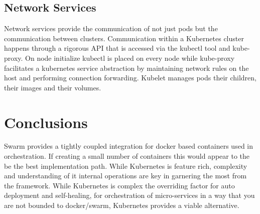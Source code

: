 \documentclass{article}
\begin{document}
\subsection{Network Services}
Network services provide the communication of not just pods but the communication between clusters. Communication within a Kubernetes cluster happens through a rigorous API that is accessed via the kubectl tool and kube-proxy. On node initialize kubectl is placed on every node while kube-proxy facilitates a kubernetes service abstraction by maintaining network rules on the host and performing connection forwarding. Kubelet manages pods their children, their images and their volumes.

\section{Conclusions}
Swarm provides a tightly coupled integration for docker based containers used in orchestration. If creating a small number of containers this would appear to the be the best implementation path. While Kubernetes is feature rich, complexity and understanding of it internal operations are key in garnering the most from the framework. While Kubernetes is complex the overriding factor for auto deployment and self-healing, for orchestration of micro-services in a way that you are not bounded to docker/swarm, Kubernetes provides a viable alternative.

\vspace{-7.5mm}
\renewcommand{\refname}{\section{References}}

\end{document}
